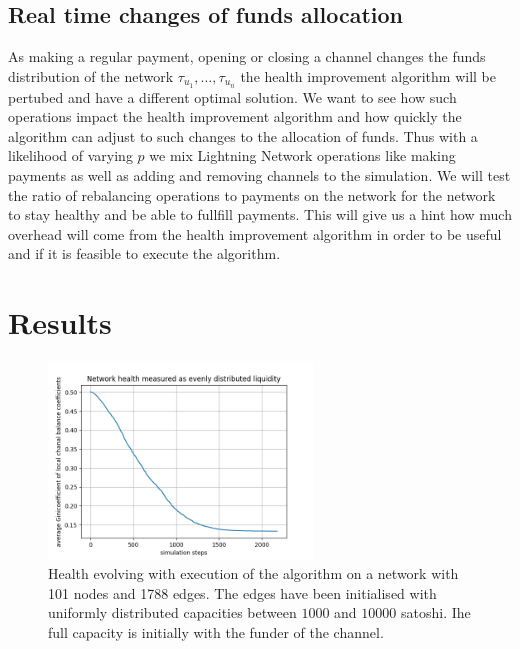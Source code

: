 \documentclass[a4paper]{paper}
\begin{document}
\subsection{Real time changes of funds allocation}
As making a regular payment, opening or closing a channel changes the funds distribution of the network $\tau_{u_1},\dots,\tau_{u_n}$ the health improvement algorithm will be pertubed and have a different optimal solution.
We want to see how such operations impact the health improvement algorithm and how quickly the algorithm can adjust to such changes to the allocation of funds.
Thus with a likelihood of varying $p$ we mix Lightning Network operations like making payments as well as adding and removing channels to the simulation.
We will test the ratio of rebalancing operations to payments on the network for the network to stay healthy and be able to fullfill payments.
This will give us a hint how much overhead will come from the health improvement algorithm in order to be useful and if it is feasible to execute the algorithm.


\section{Results}

\begin{figure}
 \centering
 \includegraphics[width=7cm]{code/results/routabilityTest/1574847007_figure.png}
 \caption{Health evolving with execution of the algorithm on a network with 101 nodes and 1788 edges. The edges have been initialised with uniformly distributed capacities between $1000$ and $10000$ satoshi. Ihe full capacity is initially with the funder of the channel.}
 \label{fig:healthovertime}
\end{figure}
\end{document}
